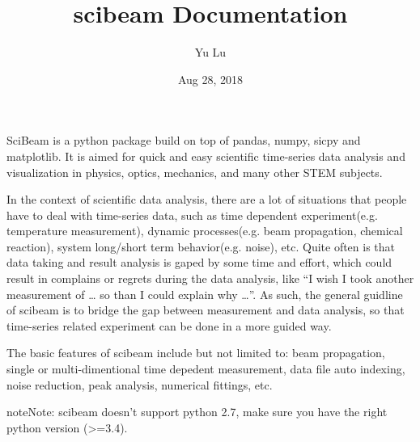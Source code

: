 \documentclass[letterpaper,10pt,english]{sphinxmanual}
\title{scibeam Documentation}
\date{Aug 28, 2018}
\author{Yu Lu}
\let\sphinxpxdimen\pdfpxdimen\else\newdimen\sphinxpxdimen
\begin{document}
\maketitle
\sphinxtableofcontents
{}\label{\detokenize{index::doc}}


\noindent{\hspace*{\fill}\sphinxincludegraphics[width=700\sphinxpxdimen]{{logo}.png}\hspace*{\fill}}

\begin{DUlineblock}{0em}
\item[] 
\end{DUlineblock}
\begin{DUlineblock}{0em}
\item[] 
\end{DUlineblock}

SciBeam is a python package build on top of pandas, numpy, sicpy and matplotlib. It is  aimed for quick and easy scientific time-series data analysis and visualization in physics, optics, mechanics, and many other STEM subjects.

In the context of scientific data analysis, there are a lot of situations that people have to deal with time-series data, such as time dependent experiment(e.g. temperature measurement), dynamic processes(e.g. beam propagation, chemical reaction), system long/short term behavior(e.g. noise), etc. Quite often is that data taking and result analysis is gaped by some time and effort, which could result in complains or regrets during the data analysis,  like “I wish I took another measurement of … so than I could explain why …”. As such, the general guidline of scibeam is to bridge the gap between measurement and data analysis, so that time-series related experiment can be done in a more guided way.

The basic features of scibeam include but not limited to: beam propagation, single or multi-dimentional time depedent measurement, data file auto indexing, noise reduction, peak analysis, numerical fittings, etc.

\begin{sphinxadmonition}{note}{Note:}
scibeam doesn’t support python 2.7, make sure you have the right python version (\textgreater{}=3.4).
\end{sphinxadmonition}
\end{document}
